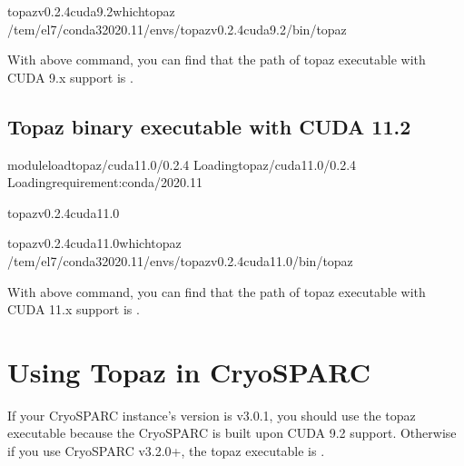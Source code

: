 \documentclass[a4paper,10pt,english]{sphinxmanual}
\begin{document}
\begin{sphinxVerbatim}[commandchars=\\\{\}]
topaz\PYGZhy{}v0.2.4\PYGZhy{}cuda9.2\PYGZdl{}\PYGZgt{}whichtopaz
/tem/el7/conda3\PYGZhy{}2020.11/envs/topaz\PYGZhy{}v0.2.4\PYGZhy{}cuda9.2/bin/topaz
\end{sphinxVerbatim}

\sphinxAtStartPar
With above command, you can find that the path of topaz executable with CUDA 9.x support is .


\subsection{Topaz binary executable with CUDA 11.2}
\label{\detokenize{topaz:topaz-binary-executable-with-cuda-11-2}}
\begin{sphinxVerbatim}[commandchars=\\\{\}]
\PYGZdl{}\PYGZgt{}moduleloadtopaz/cuda\PYGZhy{}11.0/0.2.4
Loadingtopaz/cuda\PYGZhy{}11.0/0.2.4
Loadingrequirement:conda/2020.11

topaz\PYGZhy{}v0.2.4\PYGZhy{}cuda11.0\PYGZdl{}\PYGZgt{}
\end{sphinxVerbatim}

\begin{sphinxVerbatim}[commandchars=\\\{\}]
topaz\PYGZhy{}v0.2.4\PYGZhy{}cuda11.0\PYGZdl{}\PYGZgt{}whichtopaz
/tem/el7/conda3\PYGZhy{}2020.11/envs/topaz\PYGZhy{}v0.2.4\PYGZhy{}cuda11.0/bin/topaz
\end{sphinxVerbatim}

\sphinxAtStartPar
With above command, you can find that the path of topaz executable with CUDA 11.x support is .


\section{Using Topaz in CryoSPARC}
\label{\detokenize{topaz:using-topaz-in-cryosparc}}
\sphinxAtStartPar
If your CryoSPARC instance’s version is v3.0.1, you should use the topaz executable  because the CryoSPARC is built upon CUDA 9.2 support.
Otherwise if you use CryoSPARC v3.2.0+, the topaz executable is .
\end{document}
